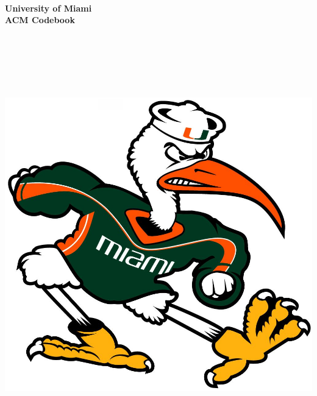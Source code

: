 \begin{titlepage}

\begin{center}





\ \\
\ \\
\ \\
\ \\
\ \\

\HRule \\[0.4cm]
{ \huge \bfseries {\color{orange} University} of {\color{darkgreen} Miami}\\ACM Codebook}\\[0.4cm]

\HRule \\[1.5cm]
\ \\
\ \\
\ \\
\ \\
\ \\

\includegraphics[scale=0.25]{Images/Sebastian.jpg}\\[1cm]


\end{center}
\end{titlepage}
